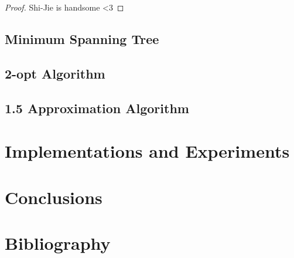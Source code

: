 \documentclass[paper=a4, fontsize=11pt]{scrartcl}	%
\numberwithin{equation}{section}		%
\numberwithin{figure}{section}			%
\numberwithin{table}{section}				%
\begin{document}
\begin{proof}
Shi-Jie is handsome <3
\end{proof}

\subsection{Minimum Spanning Tree}
\subsection{2-opt Algorithm}
\subsection{1.5 Approximation Algorithm}

\section{Implementations and Experiments}

\section{Conclusions}

\section{Bibliography}

\nocite{*}

\end{document}
